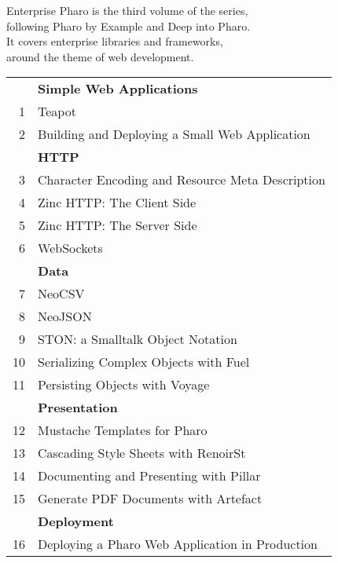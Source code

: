 \documentclass[11pt,english]{../support/latex/sbabook/sbabook}
\begin{document}
\sffamily
\pagestyle{titlingpage}
\thispagestyle{titlingpage} %

Enterprise Pharo is the third volume of the series,\\
following Pharo by Example and Deep into Pharo.\\
It covers enterprise libraries and frameworks, \\
around the theme of web development.

\begin{tabular}{@{\quad}r@{\quad}l@{}}
   & \textbf{Simple Web Applications}                 \\
1  & Teapot                                           \\
2  & Building and Deploying a Small Web Application   \\[\smallskipamount]
   & \textbf{HTTP}                                    \\
3  & Character Encoding and Resource Meta Description \\
4  & Zinc HTTP: The Client Side                       \\
5  & Zinc HTTP: The Server Side                       \\
6  & WebSockets                                       \\[\smallskipamount]
   & \textbf{Data}                                    \\
7  & NeoCSV                                           \\
8  & NeoJSON                                          \\
9  & STON: a Smalltalk Object Notation                \\
10 & Serializing Complex Objects with Fuel            \\
11 & Persisting Objects with Voyage                   \\[\smallskipamount]
   & \textbf{Presentation}                            \\
12 & Mustache Templates for Pharo                     \\
13 & Cascading Style Sheets with RenoirSt             \\
14 & Documenting and Presenting with Pillar           \\
15 & Generate PDF Documents with Artefact             \\[\smallskipamount]
   & \textbf{Deployment}                              \\
16 & Deploying a Pharo Web Application in Production  \\

\end{tabular}
\end{document}
